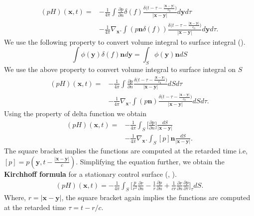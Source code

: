 \documentclass[a4paper]{article}
\begin{document}
\begin{equation}
	\begin{split}
		(pH)(\mathbf{x}, t) = &-\frac{1}{4\pi}\int {\frac{\partial p}{\partial n}\delta(f) \frac{\delta \Big(t - \tau - \frac{|\mathbf{x} - \mathbf{y}|}{c_{0}}\Big)}{|\mathbf{x} - \mathbf{y}|}} d\mathbf{y}d\tau \\
		&-\frac{1}{4\pi}\nabla_{\mathbf{x}}.\int (p \mathbf{n} \delta(f)){\frac{\delta \Big(t - \tau - \frac{|\mathbf{x} - \mathbf{y}|}{c_{0}}\Big)}{|\mathbf{x} - \mathbf{y}|}} d\mathbf{y}d\tau.
	\end{split}
\end{equation}
We use the following property to convert volume integral to surface integral (\cite{FARASSAT1988451}).
\begin{equation}\label{volume surface}
	\int \phi (\mathbf{y}) \delta (f) \mathbf{n} d\mathbf{y} = \int_{S} \phi (\mathbf{y}) \mathbf{n} dS
\end{equation}
We use the above property to convert volume integral to surface integral on $S$
\begin{equation}
	\begin{split}
		(pH)(\mathbf{x}, t) = &-\frac{1}{4\pi}\int {\frac{\partial p}{\partial n} \frac{\delta \Big(t - \tau - \frac{|\mathbf{x} - \mathbf{y}|}{c_{0}}\Big)}{|\mathbf{x} - \mathbf{y}|}} dSd\tau \\
		&-\frac{1}{4\pi}\nabla_{\mathbf{x}}.\int (p \mathbf{n} ){\frac{\delta \Big(t - \tau - \frac{|\mathbf{x} - \mathbf{y}|}{c_{0}}\Big)}{|\mathbf{x} - \mathbf{y}|}} dSd\tau.
	\end{split}
\end{equation}
Using the property of delta function we obtain
\begin{equation}
	\begin{split}
		(pH)(\mathbf{x}, t) = &-\frac{1}{4\pi}\int_{S} { \Big[\frac{\partial p}{\partial n}\Big] \frac{dS}{|\mathbf{x} - \mathbf{y}|}}  \\
		&-\frac{1}{4\pi}\nabla_{\mathbf{x}}.\int_{S} [p]\mathbf{n}{\frac{dS}{|\mathbf{x} - \mathbf{y}|}} .
	\end{split}
\end{equation}
The square bracket implies the functions are computed at the retarded time i.e, $[p] = p(\mathbf{y}, t - \frac{|\mathbf{x} - \mathbf{y}|}{c})$. Simplifying the equation further, we obtain the \textbf{Kirchhoff formula} for a stationary control surface (\cite{FARASSAT1988451}, \cite{jamaluddin}).
\begin{equation}\label{Kirchhoff Integral}
	\begin{split}
		(pH)(\mathbf{x}, t) = -\frac{1}{4\pi}\int_{S}\Big[  \frac{p}{r^{2}}\frac{\partial r}{\partial n} - \frac{1}{r}\frac{\partial p}{\partial n} + \frac{1}{c r}\frac{\partial r}{\partial n}\frac{\partial p}{\partial \tau} \Big]_{\tau} dS.
	\end{split}
\end{equation}
Where, $r = |\mathbf{x} - \mathbf{y}|$, the square bracket again implies the functions are computed at the retarded time $\tau = t - r/c$.
\end{document}
